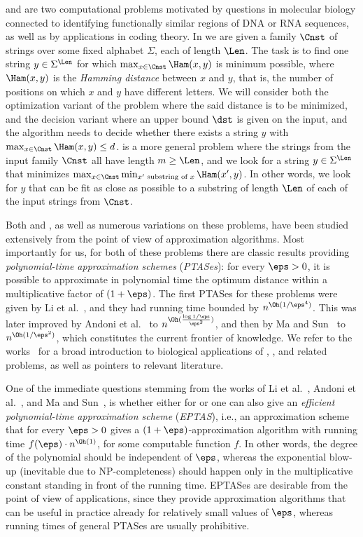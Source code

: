 \clString and \clSubstring are two computational problems motivated by questions in molecular biology connected to identifying functionally similar regions of DNA or RNA sequences, as well as by applications in coding theory. In \clString we are given a family $\Cnst$ of strings over some fixed alphabet $\Sigma$, each of length $\Len$. The task is to find one string $y\in \Sigma^\Len$ for which $\max_{x\in \Cnst} \Ham(x,y)$ is minimum possible, where $\Ham(x,y)$ is the {\em{Hamming distance}} between $x$ and $y$, that is, the number of positions on which $x$ and $y$ have different letters. We will consider both the optimization variant of the problem where the said distance is to be minimized, and the decision variant where an upper bound $\dst$ is given on the input, and the algorithm needs to decide whether there exists a string $y$ with $\max_{x\in \Cnst} \Ham(x,y)\leq d$. \clSubstring is a more general problem where the strings from the input family $\Cnst$ all have length $m\geq \Len$, and we look for a string $y\in \Sigma^\Len$ that minimizes $\max_{x\in \Cnst}\min_{x'\textrm{ substring of }x} \Ham(x',y)$. In other words, we look for $y$ that can be fit as close as possible to a substring of length $\Len$ of each of the input strings from $\Cnst$.

Both \clString and \clSubstring, as well as numerous variations on these problems, have been studied extensively from the point of view of approximation algorithms. Most importantly for us, for both of these problems there are classic results providing {\em{polynomial-time approximation schemes}} ({\em{PTASes}}): for every $\eps>0$, it is possible to approximate in polynomial time the optimum distance within a multiplicative factor of $(1+\eps)$. The first PTASes for these problems were given by Li et al.~\cite{limawang}, and they had running time bounded by $n^{\Oh(1/\eps^4)}$. This was later improved by Andoni et al.~\cite{AndoniIP06} to $n^{\Oh(\frac{\log 1/\eps}{\eps^2})}$, and then by Ma and Sun~\cite{MaS09} to $n^{\Oh(1/\eps^2)}$, which constitutes the current frontier of  knowledge. We refer to the works~\cite{Boucher15,LiMW02a,GrammNR03,limawang,MaS09,Marx08} for a broad introduction to biological applications of \clString, \clSubstring, and related problems, as well as pointers to relevant literature.

One of the immediate questions stemming from the works of Li et al.~\cite{limawang}, Andoni et al.~\cite{AndoniIP06}, and Ma and Sun~\cite{MaS09}, is whether either for \clString or \clSubstring one can also give an {\em{efficient polynomial-time approximation scheme}} ({\em{EPTAS}}), i.e., an approximation scheme that for every $\eps>0$ gives a $(1+\eps)$-approximation algorithm with running time $f(\eps)\cdot n^{\Oh(1)}$, for some computable function $f$. In other words, the degree of the polynomial should be independent of $\eps$, whereas the exponential blow-up (inevitable due to NP-completeness) should happen only in the multiplicative constant standing in front of the running time. EPTASes are desirable from the point of view of applications, since they provide approximation algorithms that can be useful in practice already for relatively small values of $\eps$, whereas running times of general PTASes are usually prohibitive.

